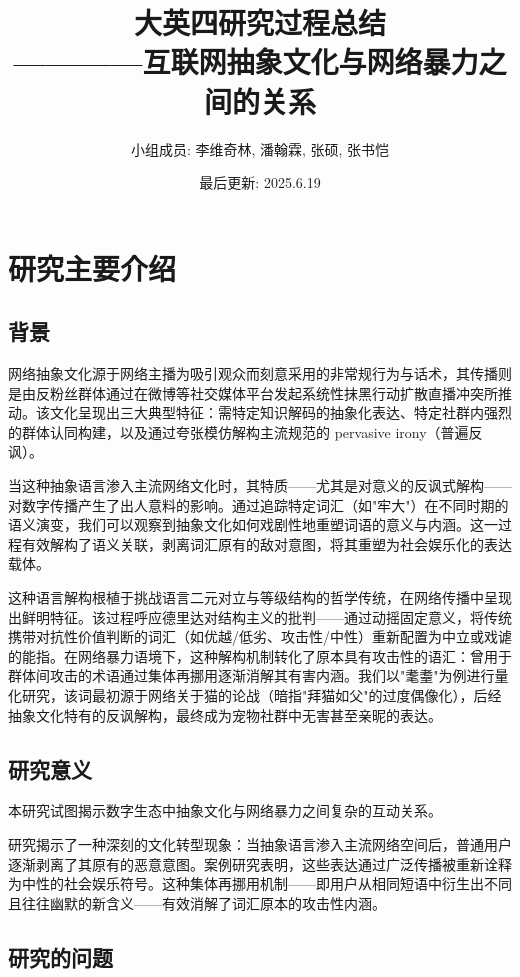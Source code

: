 \documentclass[12pt,a4paper]{ctexart}
\title{
    {\heiti\zihao{2} 大英四研究过程总结}\\
    {\songti\zihao{4} ————互联网抽象文化与网络暴力之间的关系}
}
\author{
    {\songti\zihao{4} 小组成员: 李维奇林, 潘翰霖, 张硕, 张书恺}\\
}
\date{最后更新: 2025.6.19}
\begin{document}
\maketitle
\tableofcontents
\newpage

\section{研究主要介绍}
\subsection{背景}

网络抽象文化源于网络主播为吸引观众而刻意采用的非常规行为与话术，其传播则是由反粉丝群体通过在微博等社交媒体平台发起系统性抹黑行动扩散直播冲突所推动。该文化呈现出三大典型特征：需特定知识解码的抽象化表达、特定社群内强烈的群体认同构建，以及通过夸张模仿解构主流规范的 pervasive irony（普遍反讽）\cite{zheng2024chinese}。

当这种抽象语言渗入主流网络文化时，其特质——尤其是对意义的反讽式解构——对数字传播产生了出人意料的影响。通过追踪特定词汇（如"牢大"）在不同时期的语义演变，我们可以观察到抽象文化如何戏剧性地重塑词语的意义与内涵。这一过程有效解构了语义关联，剥离词汇原有的敌对意图，将其重塑为社会娱乐化的表达载体。

这种语言解构根植于挑战语言二元对立与等级结构的哲学传统\cite{liu2019deconstruction}，在网络传播中呈现出鲜明特征。该过程呼应德里达对结构主义的批判——通过动摇固定意义，将传统携带对抗性价值判断的词汇（如优越/低劣、攻击性/中性）重新配置为中立或戏谑的能指。在网络暴力语境下，这种解构机制转化了原本具有攻击性的语汇：曾用于群体间攻击的术语通过集体再挪用逐渐消解其有害内涵。我们以"耄耋"为例进行量化研究，该词最初源于网络关于猫的论战（暗指"拜猫如父"的过度偶像化），后经抽象文化特有的反讽解构，最终成为宠物社群中无害甚至亲昵的表达。

\subsection{研究意义}

本研究试图揭示数字生态中抽象文化与网络暴力之间复杂的互动关系。

研究揭示了一种深刻的文化转型现象：当抽象语言渗入主流网络空间后，普通用户逐渐剥离了其原有的恶意意图。案例研究表明，这些表达通过广泛传播被重新诠释为中性的社会娱乐符号。这种集体再挪用机制——即用户从相同短语中衍生出不同且往往幽默的新含义——有效消解了词汇原本的攻击性内涵。

\subsection{研究的问题}
\end{document}

